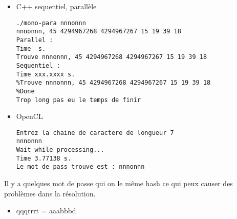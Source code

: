 \documentclass[11pt,letterpaper,sans]{article}   %
\begin{document}
\begin{itemize}
\item C++ sequentiel, parallèle
\begin{lstlisting}
./mono-para nnnonnn
nnnonnn, 45 4294967268 4294967267 15 19 39 18 
Parallel : 
Time  s.
Trouve nnnonnn, 45 4294967268 4294967267 15 19 39 18 
Sequentiel : 
Time xxx.xxxx s.
%Trouve nnnonnn, 45 4294967268 4294967267 15 19 39 18 
%Done
Trop long pas eu le temps de finir
\end{lstlisting}

\item OpenCL
\begin{lstlisting}
Entrez la chaine de caractere de longueur 7
nnnonnn
Wait while processing...
Time 3.77138 s.
Le mot de pass trouve est : nnnonnn
\end{lstlisting}
\end{itemize}

Il y a quelques mot de passe qui on le même hash ce qui peux causer des problèmes dans la résolution.
\begin{itemize}
\item qqqrrrt = aaabbbd
\end{itemize}
\end{document}
